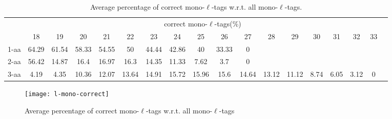 \documentclass{article}[12pt]
\begin{document}
\begin{landscape}
\begin{table}[h]
\vspace{3mm}
\end{table}
\begin{table}[h]\tiny
\vspace{3mm}
{\centering
\begin{center}
\begin{tabular}{|l|c|c|c|c|c|c|c|c|c|c|c|c|c|c|c|c|c|}
  \hline
  & \multicolumn{ 16 }{|c|}{correct mono-$\ell$-tags(\%)} \\
  \cline{2- 17}
    & 18 & 19 & 20 & 21 & 22 & 23 & 24 & 25 & 26 & 27 & 28 & 29 & 30 & 31 & 32 & 33\\
  \hline
1-aa  & 64.29 & 61.54 & 58.33 & 54.55 & 50 & 44.44 & 42.86 & 40 & 33.33 & 0 &  &  &  &  &  & \\
2-aa  & 56.42 & 14.87 & 16.4 & 16.97 & 16.3 & 14.35 & 11.33 & 7.62 & 3.7 & 0 &  &  &  &  &  & \\
3-aa  & 4.19 & 4.35 & 10.36 & 12.07 & 13.64 & 14.91 & 15.72 & 15.96 & 15.6 & 14.64 & 13.12 & 11.12 & 8.74 & 6.05 & 3.12 & 0\\
 \hline
\end{tabular}
\end{center}
\par}
\centering

\caption{ Average percentage of correct mono-$\ell$-tags w.r.t. all mono-$\ell$-tags.}
\label{table:l-mono-correct}

\vspace{3mm}
\end{table}
\end{landscape}

\begin{figure}
  \begin{center}
\texttt{[image: l-mono-correct]}
\end{center}
\caption{Average percentage of correct mono-$\ell$-tags w.r.t. all mono-$\ell$-tags}
  \label{fig:l-mono-correct}
\end{figure}


\end{document}
